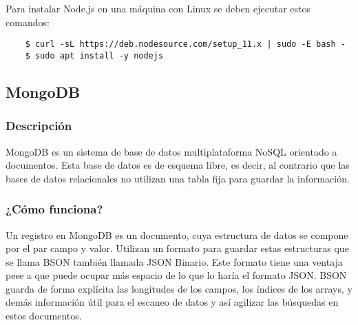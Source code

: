 Para instalar Node.js en una máquina con Linux se deben ejecutar estos comandos:
\begin{lstlisting}
    $ curl -sL https://deb.nodesource.com/setup_11.x | sudo -E bash -
    $ sudo apt install -y nodejs
\end{lstlisting}




\subsection{MongoDB}

\subsubsection{ Descripción }

MongoDB  \cite{URL::MongoDB} es un sistema de base de datos multiplataforma NoSQL   \cite{URL::NoSQL} orientado a documentos. Esta base de datos es de esquema libre, es decir, al contrario que las bases de datos relacionales no utilizan una tabla fija para guardar la información.
\subsubsection{ ¿Cómo funciona? }

Un registro en MongoDB es un documento, cuya estructura de datos se compone por el par campo y valor. Utilizan un formato para guardar estas estructuras que se llama BSON  \cite{URL::BSON} también llamada JSON \cite{URL::json} Binario. Este formato tiene una ventaja pese a que puede ocupar más espacio de lo que lo haría el formato JSON. BSON guarda de forma explícita las longitudes de los campos, los índices de los arrays, y demás información útil para el escaneo de datos y así agilizar las búsquedas en estos documentos.

